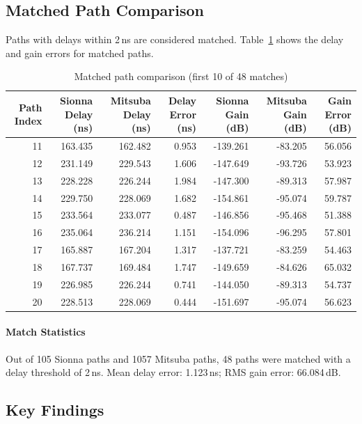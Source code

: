 \subsection{Matched Path Comparison}

Paths with delays within 2\,ns are considered matched. Table~\ref{tab:path_match} shows 
the delay and gain errors for matched paths.

\begin{table}
\caption{Matched path comparison (first 10 of 48 matches)}
\label{tab:path_match}
\begin{tabular}{rrrrrrr}
\toprule
Path Index & Sionna Delay (ns) & Mitsuba Delay (ns) & Delay Error (ns) & Sionna Gain (dB) & Mitsuba Gain (dB) & Gain Error (dB) \\
\midrule
11 & 163.435 & 162.482 & 0.953 & -139.261 & -83.205 & 56.056 \\
12 & 231.149 & 229.543 & 1.606 & -147.649 & -93.726 & 53.923 \\
13 & 228.228 & 226.244 & 1.984 & -147.300 & -89.313 & 57.987 \\
14 & 229.750 & 228.069 & 1.682 & -154.861 & -95.074 & 59.787 \\
15 & 233.564 & 233.077 & 0.487 & -146.856 & -95.468 & 51.388 \\
16 & 235.064 & 236.214 & 1.151 & -154.096 & -96.295 & 57.801 \\
17 & 165.887 & 167.204 & 1.317 & -137.721 & -83.259 & 54.463 \\
18 & 167.737 & 169.484 & 1.747 & -149.659 & -84.626 & 65.032 \\
19 & 226.985 & 226.244 & 0.741 & -144.050 & -89.313 & 54.737 \\
20 & 228.513 & 228.069 & 0.444 & -151.697 & -95.074 & 56.623 \\
\bottomrule
\end{tabular}
\end{table}



\paragraph{Match Statistics}
Out of 105 Sionna paths and 1057 Mitsuba paths, 
48 paths were matched with a delay threshold of 2\,ns.
Mean delay error: 1.123\,ns; 
RMS gain error: 66.084\,dB.


\subsection{Key Findings}

